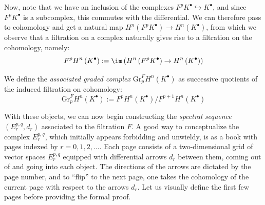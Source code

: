 \noindent Now, note that we have an inclusion of the complexes $F^pK^\bullet \hookrightarrow K^\bullet$, and since $F^pK^\bullet$ is a subcomplex, this commutes with the differential. We can therefore pass to cohomology and get a natural map $H^n\left(F^pK^\bullet\right) \to H^n\left(K^\bullet\right)$, from which we observe that a filtration on a complex naturally gives rise to a filtration on the cohomology, namely:
$$
F^pH^n\left(K^\bullet\right):= \im \left(H^n\left(F^pK^\bullet\right) \to H^n\left(K^\bullet\right)\right)
$$

\begin{definition}
    We define the \emph{associated graded complex} $\mathrm{Gr}_p^F H^n\left(K^\bullet\right)$ as successive quotients of the induced filtration on cohomology:
    $$
    \mathrm{Gr}_p^F H^n\left(K^\bullet\right) := F^pH^n\left(K^\bullet\right)/F^{p+1}H^n\left(K^\bullet\right)
    $$
\end{definition}

\noindent With these objects, we can now begin constructing the \emph{spectral sequence} $\left(E_r^{p,q}, d_r\right)$ associated to the filtration $F$. A good way to conceptualize the complex $E_r^{p,q}$, which initially appears forbidding and unwieldy, is as a book with pages indexed by $r=0,1,2,\ldots$. Each page consists of a two-dimensional grid of vector spaces $E_r^{p,q}$ equipped with differential arrows $d_r$ between them, coming out of and going into each object. The directions of the arrows are dictated by the page number, and to ``flip'' to the next page, one takes the cohomology of the current page with respect to the arrows $d_r$. Let us visually define the first few pages before providing the formal proof.


